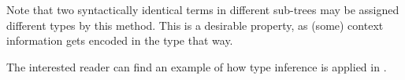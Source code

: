 Note that two syntactically identical terms in different sub-trees may be assigned
different types by this method. This is a desirable property, as (some) context information
gets encoded in the type that way.

The interested reader can find an example of how type inference is applied in .

\begin{comment}
\medskip
\examplePar Say $I$, $T$ are types, $\widehat{I}_0 : I\to\B$ a qualifier, $\S$ a type variable, $0:T$ a constant.
The term $(f:I_0\to\S)\,i\mapsto f\,i\,i ~/~ 0$ will induce the following type
inferences:

\begin{tikzpicture}[node distance=1em]
  \node(farg) {$(f:I_0\to\S)$};
  \node(iarg)[right=of farg] {$i$};
  \node(mapsto)[right=of iarg] {$\mapsto$};
  \node(f)[right=of mapsto] {$f$};
  \node(i1)[right=of f] {$i$};
  \node(i2)[right=of i1] {$i$};
  \node(slash)[right=of i2] {$\big/$};
  \node(zero)[right=of slash] {$0$};
  \node(l0)[coordinate,below=1mm of farg] {};
  \node(l1)[coordinate,below=4.5mm of l0] {};
  \node(l2)[coordinate,below=3.5mm of l1] {};
  \node(l3)[coordinate,below=3.5mm of l2] {};
  \node(l4)[coordinate,below=3.5mm of l3] {};
  \def\ytip{2pt}
  \draw (l0 -| farg.west) -- +(0,-\ytip) -| (l0 -| farg.east) node[pos=0.25,below] {\tiny $I_0\to I\to T$};
  \draw (l0 -| iarg.west) -- +(0,-\ytip) -| (l0 -| iarg.east) node[pos=0.25,below] {\tiny $I$};
  \draw (l0 -| f.west) -- +(0,-\ytip) -| (l0 -| f.east) node[pos=0.5,anchor=23,inner xsep=0] {\tiny $I_0\to I\to T$};
  \draw (l0 -| i1.west) -- +(0,-\ytip) -| (l0 -| i1.east) node[pos=0.25,below] {\tiny $I_0$};
  \draw (l0 -| i2.west) -- +(0,-\ytip) -| (l0 -| i2.east) node[pos=0.25,below] {\tiny $I$};
  \draw (l0 -| zero.west) -- +(0,-\ytip) -| (l0 -| zero.east) node[pos=0.25,below] {\tiny $T$};
  \draw (l1 -| f.west) -- +(0,-\ytip) -| (l1 -| i1.east) node[pos=0.25,below] {\tiny $I_0\to T$};
  \draw (l2 -| f.west) -- +(0,-\ytip) -| (l2 -| i2.east) node[pos=0.25,below] {\tiny $T$};
  \draw (l3 -| f.west) -- +(0,-\ytip) -| (l3 -| zero.east) node[pos=0.25,below] {\tiny $T$};
  \draw (l4 -| farg.west) -- +(0,-\ytip) -| (l4 -| zero.east) node[pos=0.25,below] {\tiny $(I_0\to I\to T)\to I\to T$};
\end{tikzpicture}

\noindent
In this case, the type variable $\S$ has been assigned $I\to T$.
\end{comment}

